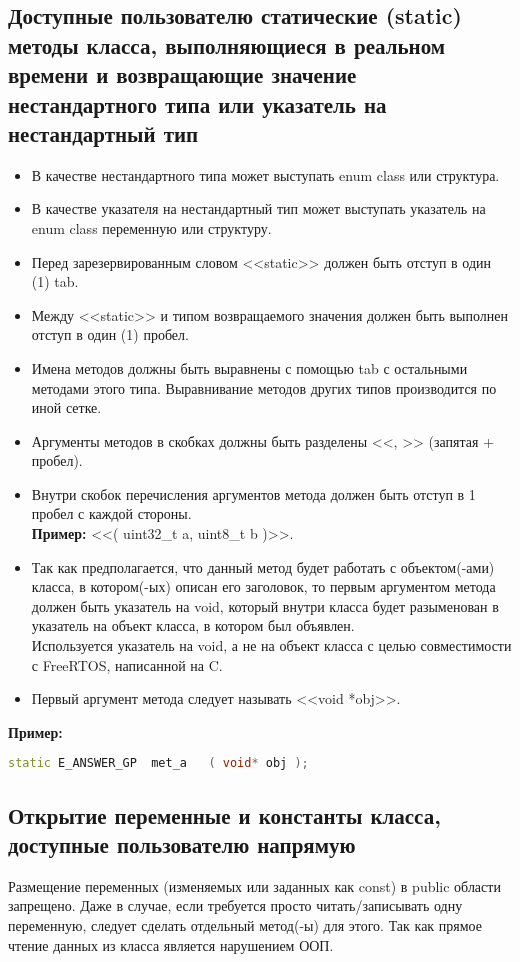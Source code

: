 \subsection{Доступные пользователю статические (static) методы класса, выполняющиеся в реальном времени и возвращающие значение нестандартного типа или указатель на нестандартный тип}\label{dp:s:n}
\begin{itemize}
	\item В качестве нестандартного типа может выступать enum class или структура.
	\item В качестве указателя на нестандартный тип может выступать указатель на enum class переменную или структуру.
	\item Перед зарезервированным словом <<static>> должен быть отступ в один (1) tab.
	\item Между <<static>> и типом возвращаемого значения должен быть выполнен отступ в один (1) пробел.
	\item Имена методов должны быть выравнены с помощью tab с остальными методами этого типа. Выравнивание методов других типов производится по иной сетке.
	\item Аргументы методов в скобках должны быть разделены <<, >> (запятая + пробел).
	\item Внутри скобок перечисления аргументов метода должен быть отступ в 1 пробел с каждой стороны.\\\textbf{Пример: } <<( uint32\_t a, uint8\_t b )>>.
	\item Так как предполагается, что данный метод будет работать с объектом(-ами) класса, в котором(-ых) описан его заголовок, то первым аргументом метода должен быть указатель на void, который внутри класса будет разыменован в указатель на объект класса, в котором был объявлен.\\Используется указатель на void, а не на объект класса с целью совместимости с FreeRTOS, написанной на C.
	\item Первый аргумент метода следует называть <<void *obj>>.
\end{itemize}
\textbf{Пример:}\begin{lstlisting}[language=C++, frame=tlBR, basicstyle=\fontsize{10}{10}\ttfamily]
	static E_ANSWER_GP	met_a	( void* obj );
\end{lstlisting}

\subsection{Открытие переменные и константы класса, доступные пользователю напрямую}\label{dp:op}
Размещение переменных (изменяемых или заданных как const) в public области запрещено. Даже в случае, если требуется просто читать/записывать одну переменную, следует сделать отдельный метод(-ы) для этого. Так как прямое чтение данных из класса является нарушением ООП.

